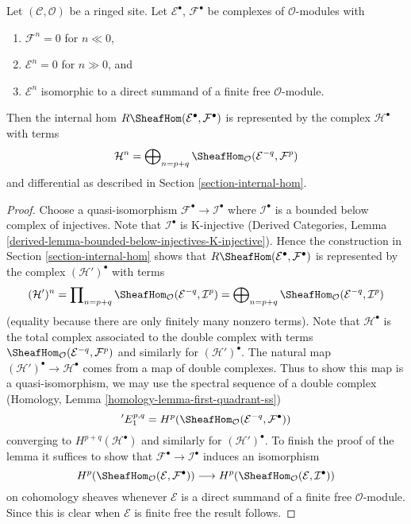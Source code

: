 \begin{lemma}
\label{lemma-Rhom-complex-of-direct-summands-finite-free}
Let $(\mathcal{C}, \mathcal{O})$ be a ringed site.
Let $\mathcal{E}^\bullet$, $\mathcal{F}^\bullet$ be complexes
of $\mathcal{O}$-modules with
\begin{enumerate}
\item $\mathcal{F}^n = 0$ for $n \ll 0$,
\item $\mathcal{E}^n = 0$ for $n \gg 0$, and
\item $\mathcal{E}^n$ isomorphic to a direct summand of a finite
free $\mathcal{O}$-module.
\end{enumerate}
Then the internal hom $R\SheafHom(\mathcal{E}^\bullet, \mathcal{F}^\bullet)$
is represented by the complex $\mathcal{H}^\bullet$ with terms
$$
\mathcal{H}^n =
\bigoplus\nolimits_{n = p + q}
\SheafHom_\mathcal{O}(\mathcal{E}^{-q}, \mathcal{F}^p)
$$
and differential as described in Section \ref{section-internal-hom}.
\end{lemma}

\begin{proof}
Choose a quasi-isomorphism $\mathcal{F}^\bullet \to \mathcal{I}^\bullet$
where $\mathcal{I}^\bullet$ is a bounded below complex of injectives.
Note that $\mathcal{I}^\bullet$ is K-injective
(Derived Categories, Lemma
\ref{derived-lemma-bounded-below-injectives-K-injective}).
Hence the construction in Section \ref{section-internal-hom}
shows that
$R\SheafHom(\mathcal{E}^\bullet, \mathcal{F}^\bullet)$ is 
represented by the complex $(\mathcal{H}')^\bullet$ with terms
$$
(\mathcal{H}')^n =
\prod\nolimits_{n = p + q}
\SheafHom_\mathcal{O}(\mathcal{E}^{-q}, \mathcal{I}^p) =
\bigoplus\nolimits_{n = p + q}
\SheafHom_\mathcal{O}(\mathcal{E}^{-q}, \mathcal{I}^p)
$$
(equality because there are only finitely many nonzero terms).
Note that $\mathcal{H}^\bullet$ is the total complex associated to
the double complex with terms
$\SheafHom_\mathcal{O}(\mathcal{E}^{-q}, \mathcal{F}^p)$
and similarly for $(\mathcal{H}')^\bullet$.
The natural map $(\mathcal{H}')^\bullet \to \mathcal{H}^\bullet$
comes from a map of double complexes.
Thus to show this map is a quasi-isomorphism, we may use the spectral
sequence of a double complex
(Homology, Lemma \ref{homology-lemma-first-quadrant-ss})
$$
{}'E_1^{p, q} =
H^p(\SheafHom_\mathcal{O}(\mathcal{E}^{-q}, \mathcal{F}^\bullet))
$$
converging to $H^{p + q}(\mathcal{H}^\bullet)$ and similarly for
$(\mathcal{H}')^\bullet$. To finish the proof of the lemma it
suffices to show that $\mathcal{F}^\bullet \to \mathcal{I}^\bullet$
induces an isomorphism
$$
H^p(\SheafHom_\mathcal{O}(\mathcal{E}, \mathcal{F}^\bullet))
\longrightarrow
H^p(\SheafHom_\mathcal{O}(\mathcal{E}, \mathcal{I}^\bullet))
$$
on cohomology sheaves whenever $\mathcal{E}$ is a direct summand of a
finite free $\mathcal{O}$-module. Since this is clear when $\mathcal{E}$
is finite free the result follows.
\end{proof}









